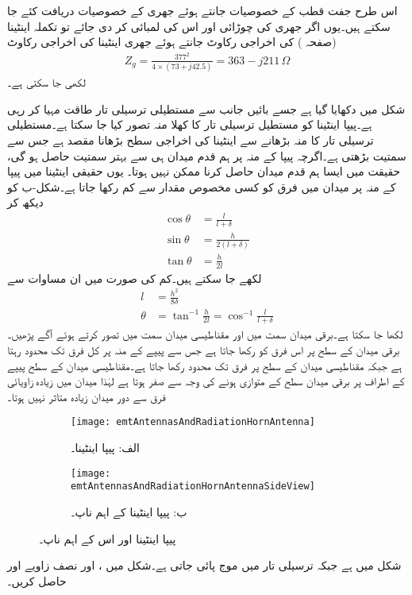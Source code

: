 اس طرح جفت قطب کے خصوصیات جانتے ہوئے جھری کے خصوصیات دریافت کئے جا سکتے ہیں۔یوں اگر جھری کی چوڑائی  اور اس کی لمبائی  کر دی جائے تو تکملہ اینٹینا (صفحہ ) کی اخراجی رکاوٹ   جانتے ہوئے جھری اینٹینا کی اخراجی رکاوٹ
\begin{align}
Z_g=\frac{377^2}{4 \times (73+j42.5)}=363-j 211 \, \Omega
\end{align}
لکھی جا سکتی ہے۔

شکل  میں  دکھایا گیا ہے جسے بائیں جانب سے مستطیلی ترسیلی تار طاقت مہیا کر رہی ہے۔پیپا اینٹینا کو مستطیل ترسیلی تار کا کھلا منہ تصور کیا جا سکتا ہے۔مستطیلی ترسیلی تار کا منہ بڑھانے سے اینٹینا کی اخراجی سطح بڑھانا مقصد ہے جس سے سمتیت بڑھتی ہے۔اگرچہ پیپا کے منہ پر ہم قدم میدان ہی سے بہتر سمتیت حاصل ہو گی، حقیقت میں ایسا ہم قدم میدان حاصل کرنا ممکن نہیں ہوتا۔ یوں حقیقی اینٹینا میں پیپا کے منہ پر میدان میں فرق کو کسی مخصوص مقدار  سے کم رکھا جاتا ہے۔شکل-ب کو دیکھ کر
  \begin{align*}
\cos \theta&=\frac{l}{l+\delta}\\
\sin \theta&=\frac{h}{2(l+\delta)}\\
\tan \theta&=\frac{h}{2l}
\end{align*}
لکھے جا سکتے ہیں۔کم  کی صورت میں ان مساوات سے
\begin{align}
l&=\frac{h^2}{8 \delta}\\
\theta&=\tan^{-1} \frac{h}{2l}=\cos^{-1}\frac{l}{l+\delta}
\end{align}
لکھا جا سکتا ہے۔برقی میدان  سمت میں اور مقناطیسی میدان  سمت میں تصور کرتے ہوئے آگے پڑھیں۔برقی میدان  کے سطح پر اس فرق کو  رکھا جاتا ہے جس سے پیپے کے منہ پر کل فرق  تک محدود رہتا ہے جبکہ مقناطیسی میدان  کے سطح  پر فرق  تک محدود رکھا جاتا ہے۔مقناطیسی میدان کے سطح پیپے کے اطراف پر برقی میدان سطح کے متوازی ہونے کی وجہ سے صفر ہوتا ہے لہٰذا میدان میں زیادہ زاویائی فرق سے دور میدان زیادہ متاثر نہیں ہوتا۔

\begin{figure}
\centering
\begin{subfigure}{0.4\textwidth}
\centering
\texttt{[image: emtAntennasAndRadiationHornAntenna]}
\caption*{الف: پیپا اینٹینا۔}
\end{subfigure}%
%
\begin{subfigure}{0.4\textwidth}
\centering
\texttt{[image: emtAntennasAndRadiationHornAntennaSideView]}
\caption*{ب: پیپا اینٹینا کے اہم ناپ۔}
\end{subfigure}%
\caption{پیپا اینٹینا اور اس کے اہم ناپ۔}
\label{شکل_اینٹینا_پیپا_اینٹینا}
\end{figure}
شکل میں  ہے جبکہ ترسیلی تار میں  موج پائی جاتی ہے۔شکل میں ،  اور نصف زاویے  اور  حاصل کریں۔

